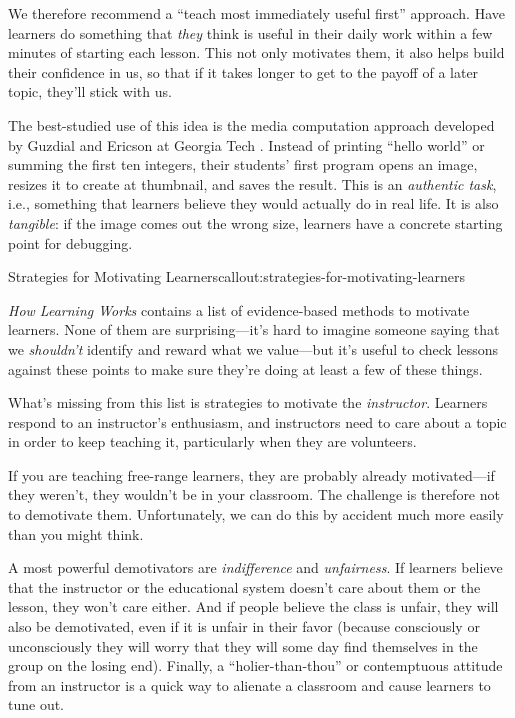 We therefore recommend a ``teach most immediately useful first''
approach.  Have learners do something that \emph{they} think is useful
in their daily work within a few minutes of starting each lesson.
This not only motivates them, it also helps build their confidence in
us, so that if it takes longer to get to the payoff of a later topic,
they'll stick with us.

The best-studied use of this idea is the media computation approach
developed by Guzdial and Ericson at Georgia Tech
\cite{bib:guzdial-mediacomp-retrospective}.
Instead of printing ``hello world'' or summing the first ten integers,
their students' first program opens an image, resizes it to create at
thumbnail, and saves the result. This is an \emph{authentic task},
i.e., something that learners believe they would actually do in real
life. It is also \emph{tangible}: if the image comes out the wrong
size, learners have a concrete starting point for debugging.

\begin{callout}{Strategies for Motivating Learners}{callout:strategies-for-motivating-learners}

\emph{How Learning Works} \cite{fixme} contains a list of
evidence-based methods to motivate learners.  None of them are
surprising---it's hard to imagine someone saying that we
\emph{shouldn't} identify and reward what we value---but it's
useful to check lessons against these points to make sure they're
doing at least a few of these things.

What's missing from this list is strategies to motivate the
\emph{instructor}. Learners respond to an instructor's enthusiasm, and
instructors need to care about a topic in order to keep teaching it,
particularly when they are volunteers.

\end{callout}


If you are teaching free-range learners, they are probably already
motivated---if they weren't, they wouldn't be in your classroom. The
challenge is therefore not to demotivate them.  Unfortunately, we can
do this by accident much more easily than you might think.

A most powerful demotivators are \emph{indifference} and
\emph{unfairness}.  If learners believe that the instructor or the
educational system doesn't care about them or the lesson, they won't
care either. And if people believe the class is unfair, they will also
be demotivated, even if it is unfair in their favor (because
consciously or unconsciously they will worry that they will some day
find themselves in the group on the losing end). Finally, a
``holier-than-thou'' or contemptuous attitude from an instructor is a
quick way to alienate a classroom and cause learners to tune out.

